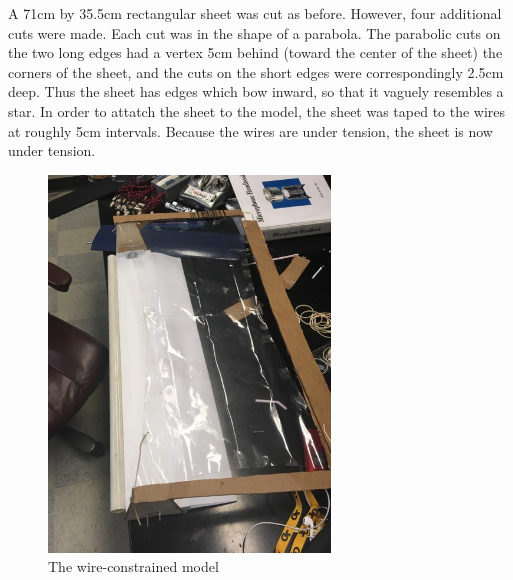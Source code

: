 \documentclass[12pt]{report} %
\begin{document}
A 71cm by 35.5cm rectangular sheet was cut as before.  However, four additional cuts were made.  Each cut was in the shape of a parabola.
 The parabolic cuts on the two long edges had a vertex 5cm behind (toward the center of the sheet) the corners of the sheet, and the cuts
on the short edges were correspondingly 2.5cm deep.  Thus the sheet has edges which bow inward, so that it vaguely resembles a star.  In
order to attatch the sheet to the model, the sheet was taped to the wires at roughly 5cm intervals.  Because the wires are under tension,
the sheet is now under tension.
\begin{figure}
\includegraphics[height = 10cm]{gb_wire_constraint.jpg}
\caption{The wire-constrained model}
\label{fig:wire}
\end{figure}
\end{document}
